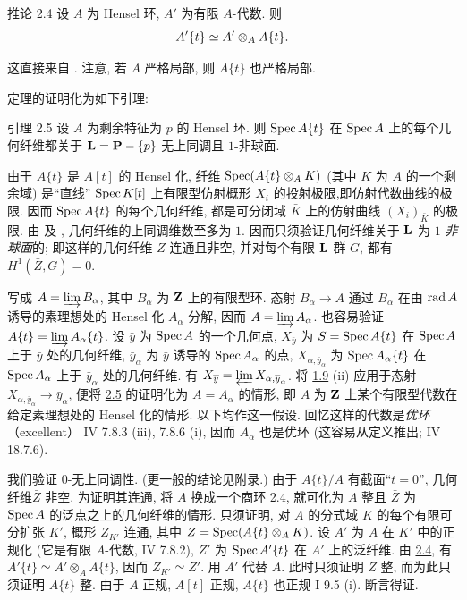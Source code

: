 \begin{enonce*}{推论 2.4}
设 $A$ 为 Hensel 环, $A'$ 为有限 $A$-代数. 则
$$
A'\{t\}\simeq A'\otimes_A A\{t\}{\quoi}.
$$
\end{enonce*}

这直接来自 . 注意, 若 $A$ 严格局部, 则 $A\{t\}$ 也严格局部.

定理的证明化为如下引理:

\begin{enonce*}{引理 2.5}
设 $A$ 为剩余特征为 $p$ 的 Hensel 环. 则 $\Spec A\{t\}$ 在 $\Spec A$ 上的每个几何纤维都关于 $\LL=\PP-\{p\}$ 无上同调且 $1$-非球面.
\end{enonce*}

由于 $A\{t\}$ 是 $A[t]$ 的 Hensel 化, 纤维 $\Spec(A\{t\}\otimes_A K)$ (其中 $K$ 为 $A$ 的一个剩余域) 是“直线” $\Spec K[t]$ 上有限型仿射概形 $X_i$ 的投射极限,\pageoriginale 即仿射代数曲线的极限. 因而 $\Spec A\{t\}$ 的每个几何纤维, 都是可分闭域 $\bar K$ 上的仿射曲线 $(X_i)_{\bar K}$ 的极限. 由  及 , 几何纤维的上同调维数至多为 $1$. 因而只须验证几何纤维关于 $\LL$ 为 $1$-\emph{非球面}的; 即这样的几何纤维 $\bar Z$ 连通且非空, 并对每个有限 $\LL$-群 $G$, 都有 $H^1(\bar Z,G)=0$.

写成 $A=\varinjlim B_\alpha$, 其中 $B_\alpha$ 为 $\ZZ$ 上的有限型环. 态射 $B_\alpha\rightarrow A$ 通过 $B_\alpha$ 在由 $\rad A$ 诱导的素理想处的 Hensel 化 $A_\alpha$ 分解, 因而 $A=\varinjlim A_\alpha$. 也容易验证 $A\{t\}=\varinjlim A_\alpha\{t\}$. 设 $\bar y$ 为 $\Spec A$ 的一个几何点, $X_{\bar y}$ 为 $S=\Spec A\{t\}$ 在 $\Spec A$ 上于 $\bar y$ 处的几何纤维, $\bar y_\alpha$ 为 $\bar y$ 诱导的 $\Spec A_\alpha$ 的点, $X_{\alpha,\bar y_\alpha}$ 为 $\Spec A_\alpha\{t\}$ 在 $\Spec A_\alpha$ 上于 $\bar y_\alpha$ 处的几何纤维. 有 $X_{\bar y}=\varprojlim X_{\alpha,\bar y_\alpha}$. 将 \hyperref[XV.prop1.9]{1.9} (ii) 应用于态射 $X_{\alpha,\bar y_\alpha}\rightarrow\bar y_\alpha$, 便将 \hyperref[XV.lem2.5]{2.5} 的证明化为 $A=A_\alpha$ 的情形, 即 $A$ 为 $\ZZ$ 上某个有限型代数在给定素理想处的 Hensel 化的情形. 以下均作这一假设. 回忆这样的代数是\emph{优环}（excellent） \sisi{(}{}\EGA IV 7.8.3 (iii), 7.8.6 (i)\sisi{)}{}, 因而 $A_\alpha$ 也是优环 (这容易从定义推出; \cf \EGA IV 18.7.6).

我们验证 $0$-无上同调性. (更一般的结论见附录.) 由于 $A\{t\}/A$ 有截面“$t=0$”, 几何纤维\pageoriginale $\bar Z$ 非空. 为证明其连通, 将 $A$ 换成一个商环 \sisi{(}{}\hyperref[XV.cor2.4]{2.4}\sisi{)}{}, 就可化为 $A$ 整且 $\bar Z$ 为 $\Spec A$ 的泛点之上的几何纤维的情形. 只须证明, 对 $A$ 的分式域 $K$ 的每个有限可分扩张 $K'$, 概形 $Z_{K'}$ 连通, 其中 $Z=\Spec(A\{t\}\otimes_A K)$. 设 $A'$ 为 $A$ 在 $K'$ 中的正规化 (它是有限 $A$-代数, \sisi{(}{}\EGA IV 7.8.2\sisi{)}{}), $Z'$ 为 $\Spec A'\{t\}$ 在 $A'$ 上的泛纤维. 由 \hyperref[XV.cor2.4]{2.4}, 有 $A'\{t\}\simeq A'\otimes_A A\{t\}$, 因而 $Z_{K'}\simeq Z'$. 用 $A'$ 代替 $A$. 此时只须证明 $Z$ 整, 而为此只须证明 $A\{t\}$ 整. 由于 $A$ 正规, $A[t]$ 正规, $A\{t\}$ 也正规 \sisi{(}{} I 9.5 (i)\sisi{)}{}. 断言得证.

